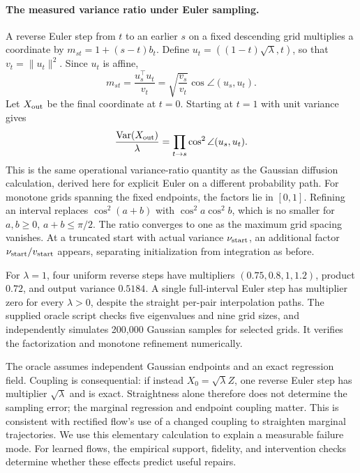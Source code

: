\paragraph{The measured variance ratio under Euler sampling.}
A reverse Euler step from $t$ to an earlier $s$ on a fixed descending grid multiplies a coordinate by
$m_{st}=1+(s-t)b_t$. Define
$u_t=((1-t)\sqrt\lambda,t)$, so that $v_t=\|u_t\|^2$. Since $u_t$ is affine,
\begin{equation}
m_{st}=\frac{u_s^\top u_t}{v_t}
=\sqrt{\frac{v_s}{v_t}}\cos\angle(u_s,u_t).
\label{eq:fm_euler_step}
\end{equation}
Let $X_{\rm out}$ be the final coordinate at $t=0$. Starting at $t=1$
with unit variance gives
\begin{equation}
\frac{\operatorname{Var}(X_{\rm out})}{\lambda}
=\prod_{t\rightarrow s}\cos^2\angle(u_s,u_t).
\label{eq:fm_variance_ratio}
\end{equation}
This is the same operational variance-ratio quantity as the Gaussian diffusion
calculation, derived here for explicit Euler on a different probability path.
For monotone grids spanning the fixed endpoints, the factors lie in $[0,1]$.
Refining an interval replaces $\cos^2(a+b)$ with
$\cos^2a\cos^2b$, which is no smaller for $a,b\geq0$, $a+b\leq\pi/2$.
The ratio converges to one as the maximum grid spacing vanishes.
At a truncated start with actual variance $\nu_{\rm start}$, an additional
factor $\nu_{\rm start}/v_{\rm start}$ appears, separating initialization from
integration as before.

For $\lambda=1$, four uniform reverse steps have multipliers
$(0.75,0.8,1,1.2)$, product $0.72$, and output variance $0.5184$.
A single full-interval Euler step has multiplier zero for every $\lambda>0$,
despite the straight per-pair interpolation paths. The supplied oracle script
checks five eigenvalues and nine grid sizes, and independently simulates
200,000 Gaussian samples for selected grids. It verifies the factorization
and monotone refinement numerically.

The oracle assumes independent Gaussian endpoints and an exact regression field.
Coupling is consequential: if instead $X_0=\sqrt\lambda Z$, one reverse Euler
step has multiplier $\sqrt\lambda$ and is exact. Straightness alone therefore
does not determine the sampling error; the marginal regression and endpoint
coupling matter. This is consistent with rectified flow's use of a changed
coupling to straighten marginal trajectories\cite{liu2023rectified}.
We use this elementary calculation to explain a measurable failure mode.
For learned flows, the empirical support, fidelity, and intervention checks
determine whether these effects predict useful repairs.


